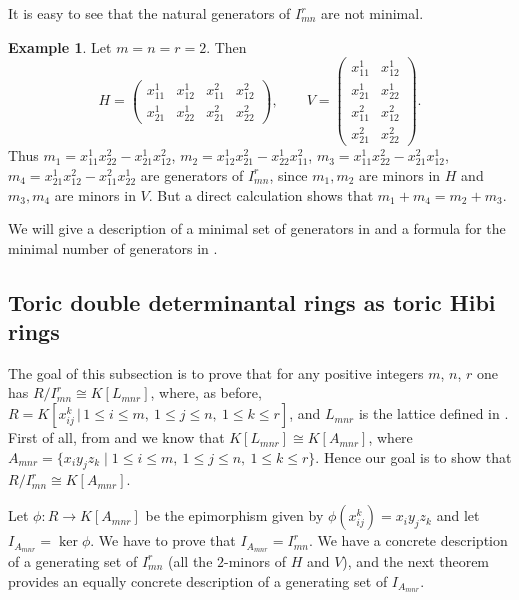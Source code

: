 \documentclass[12pt]{amsart}
\numberwithin{equation}{section}
\theoremstyle{definition}
\newtheorem{example}[theorem]{Example}
\begin{document}
It is easy to see that the natural generators of $I_{mn}^r$ are not minimal. 
\begin{example}
    Let $m=n=r=2$. Then 
    $$H=\begin{pmatrix} x_{11}^{1} &x_{12}^{1}& x_{11}^{2} &x_{12}^{2} \\[1ex]
    x_{21}^{1} & x_{22}^{1} & x_{21}^{2} & x_{22}^{2}
    \end{pmatrix}, \qquad
    V=\begin{pmatrix} x_{11}^{1} &x_{12}^{1} \\[1ex]
    x_{21}^{1} & x_{22}^{1} \\[1ex]
    x_{11}^{2} &x_{12}^{2} \\[1ex]
    x_{21}^{2} & x_{22}^{2}
    \end{pmatrix}.$$
    Thus $m_1=x_{11}^{1}x_{22}^{2}- x_{21}^{1}x_{12}^{2}$, $m_2=x_{12}^{1} x_{21}^{2}-x_{22}^{1}x_{11}^{2}$, $m_3=x_{11}^{1} x_{22}^{2}-x_{21}^{2}x_{12}^{1}$, $m_4=x_{21}^{1}x_{12}^{2}-  x_{11}^{2}x_{22}^{1}$ are generators of $I_{mn}^r$, since $m_1,m_2$ are minors in $H$ and $m_3,m_4$ are minors in $V$. But a direct calculation shows that $m_1+m_4=m_2+m_3$. 
\end{example}
We will give a description of a minimal set of generators in  and a formula for the minimal number of generators in .


\subsection{Toric double determinantal rings as toric Hibi rings}

The goal of this subsection is to prove that for any positive integers $m$, $n$, $r$ one has $R/I_{mn}^r\cong K[L_{mnr}]$, where, as before, $R = K[x_{ij}^k\,|\, 1\le i\le m,\ 1\le j\le n, \ 1 \le k \le r]$, and $L_{mnr}$ is the lattice defined in . First of all, from  and  we know that $K[L_{mnr}]\cong K[A_{mnr}]$, where $A_{mnr}=\{x_iy_jz_k\mid 1\le i\le m, \ 1\le j\le n, \ 1\le k\le r\}$. Hence our goal is to show that $R/I_{mn}^r\cong K[A_{mnr}]$. 

Let $\phi: R\to K[A_{mnr}]$ be the epimorphism given by $\phi(x_{ij}^k)=x_iy_jz_k$ and let $I_{A_{mnr}}=\ker\phi$. We have to prove that $I_{A_{mnr}}=I_{mn}^{r}$. We have a concrete description of a generating set of $I_{mn}^r$ (all the $2$-minors of $H$ and $V$), and the next theorem provides an equally concrete description of a generating set of $I_{A_{mnr}}$.
\end{document}
